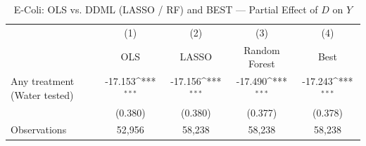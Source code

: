 \begin{table}[htbp]\centering
\def\sym#1{\ifmmode^{#1}\else\(^{#1}\)\fi}
\caption{E-Coli: OLS vs. DDML (LASSO / RF) and BEST — Partial Effect of $D$ on $Y$}
\begin{tabular}{l*{4}{c}}
\toprule
                &\multicolumn{1}{c}{(1)}&\multicolumn{1}{c}{(2)}&\multicolumn{1}{c}{(3)}&\multicolumn{1}{c}{(4)}\\
                &\multicolumn{1}{c}{OLS}&\multicolumn{1}{c}{LASSO}&\multicolumn{1}{c}{Random Forest}&\multicolumn{1}{c}{Best}\\
\midrule
Any treatment (Water tested)&  -17.153\sym{***}&  -17.156\sym{***}&  -17.490\sym{***}&  -17.243\sym{***}\\
                &  (0.380)         &  (0.380)         &  (0.377)         &  (0.378)         \\
\midrule
Observations    &   52,956         &   58,238         &   58,238         &   58,238         \\
\bottomrule
\end{tabular}
\end{table}
